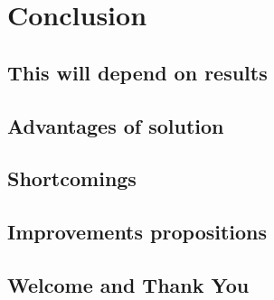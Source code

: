 
\chapter{Conclusion} %

\label{Conclusion} %




\section{This will depend on results}
\section{Advantages of solution}
\section{Shortcomings}
\section{Improvements propositions}
\section{Welcome and Thank You}
